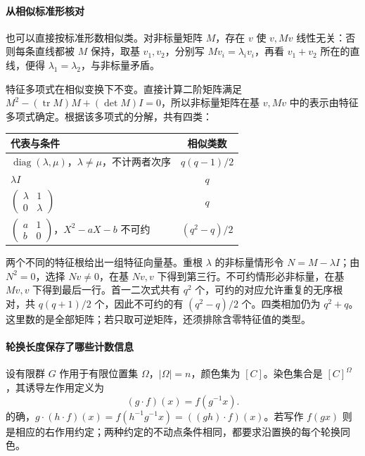 \documentclass[lang=cn,a4paper,fontset=none,zihao=false,10pt,openany,twoside]{beautybook}
\numberwithin{algorithm}{chapter}
\begin{document}
\paragraph{从相似标准形核对}
也可以直接按标准形数相似类。对非标量矩阵 $M$，存在 $v$ 使 $v,Mv$ 线性无关：否则每条直线都被 $M$ 保持，取基 $v_1,v_2$，分别写 $Mv_i=\lambda_i v_i$，再看 $v_1+v_2$ 所在的直线，便得 $\lambda_1=\lambda_2$，与非标量矛盾。

特征多项式在相似变换下不变。直接计算二阶矩阵满足 $M^2-(\operatorname{tr}M)M+(\det M)I=0$，所以非标量矩阵在基 $v,Mv$ 中的表示由特征多项式确定。根据该多项式的分解，共有四类：
\begin{center}
\begin{tabular}{@{}lc@{}}
\toprule
代表与条件 & 相似类数\\
\midrule
$\operatorname{diag}(\lambda,\mu)$，$\lambda\ne\mu$，不计两者次序 & $q(q-1)/2$\\[3pt]
$\lambda I$ & $q$\\[3pt]
$\begin{pmatrix}\lambda&1\\0&\lambda\end{pmatrix}$ & $q$\\[5pt]
$\begin{pmatrix}a&1\\b&0\end{pmatrix}$，$X^2-aX-b$ 不可约 & $(q^2-q)/2$\\
\bottomrule
\end{tabular}
\end{center}
两个不同的特征根给出一组特征向量基。重根 $\lambda$ 的非标量情形令 $N=M-\lambda I$；由 $N^2=0$，选择 $Nv\ne0$，在基 $Nv,v$ 下得到第三行。不可约情形必非标量，在基 $Mv,v$ 下得到最后一行。首一二次式共有 $q^2$ 个，可约的对应允许重复的无序根对，共 $q(q+1)/2$ 个，因此不可约的有 $(q^2-q)/2$ 个。四类相加仍为 $q^2+q$。这里数的是全部矩阵；若只取可逆矩阵，还须排除含零特征值的类型。

\paragraph{轮换长度保存了哪些计数信息}
设有限群 $G$ 作用于有限位置集 $\Omega$，$|\Omega|=n$，颜色集为 $[C]$。染色集合是 $[C]^\Omega$，其诱导左作用定义为
\[
 (g\cdot f)(x)=f(g^{-1}x).
\]
的确，$g\cdot(h\cdot f)(x)=f(h^{-1}g^{-1}x)=((gh)\cdot f)(x)$。若写作 $f(gx)$ 则是相应的右作用约定；两种约定的不动点条件相同，都要求沿置换的每个轮换同色。
\end{document}
